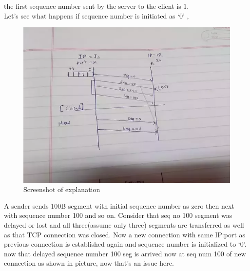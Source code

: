 \documentclass{article}
\begin{document}
 the first sequence number sent by the server to the client is 1.\\
 
 Let’s see what happens if sequence number is initiated as ‘0’ ,\\
 
  \begin{figure}[H]
 \centering
 \includegraphics[width=1.0\textwidth]{../q17/a.png}
 \caption{\label{fig:PING}Screenshot of explanation}
 \end{figure}
 
 A sender sends 100B segment with initial sequence number as zero then next with sequence number 100 and so on. Consider that seq no 100 segment was delayed or lost and all three(assume only three) segments are transferred as well as that TCP connection was closed. Now a new connection with same IP:port as previous connection is established again and sequence number is initialized to ‘0’. now that delayed sequence number 100 seg is arrived now at seq num 100 of new connection as shown in picture, now that’s an issue here.
\end{document}
